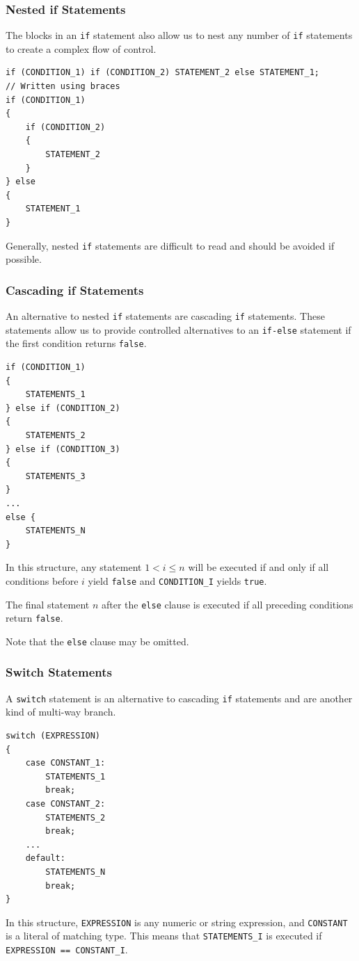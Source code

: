 \documentclass{article}
\begin{document}
\subsubsection{Nested if Statements}
The blocks in an \lstinline{if} statement also allow us to nest any number of
\lstinline{if} statements to create a complex flow of control.
\begin{lstlisting}[numbers=none]
if (CONDITION_1) if (CONDITION_2) STATEMENT_2 else STATEMENT_1;
// Written using braces
if (CONDITION_1) 
{
    if (CONDITION_2) 
    {
        STATEMENT_2
    }
} else 
{
    STATEMENT_1
}
\end{lstlisting}
Generally, nested \lstinline{if} statements are difficult to read and should be avoided if possible.
\subsubsection{Cascading if Statements}
An alternative to nested \lstinline{if} statements are cascading \lstinline{if} statements.
These statements allow us to provide controlled alternatives to an \lstinline{if-else} statement if the
first condition returns \lstinline{false}.
\begin{lstlisting}[numbers=none]
if (CONDITION_1) 
{
    STATEMENTS_1
} else if (CONDITION_2)
{
    STATEMENTS_2
} else if (CONDITION_3)
{
    STATEMENTS_3
} 
...
else {
    STATEMENTS_N
}
\end{lstlisting}
In this structure, any statement \(1 < i \leq n\) will be executed if
and only if all conditions before \(i\) yield \lstinline{false} and
\lstinline{CONDITION_I} yields \lstinline{true}. %

The final statement \(n\) after the \lstinline{else} clause is executed
if all preceding conditions return \lstinline{false}.

Note that the \lstinline{else} clause may be omitted.
\subsubsection{Switch Statements}
A \lstinline{switch} statement is an alternative to cascading \lstinline{if}
statements and are another kind of multi-way branch.
\begin{lstlisting}[numbers=none]
switch (EXPRESSION) 
{
    case CONSTANT_1:
        STATEMENTS_1
        break;
    case CONSTANT_2:
        STATEMENTS_2
        break;
    ...
    default:
        STATEMENTS_N
        break;
}
\end{lstlisting}
In this structure, \lstinline{EXPRESSION} is any numeric or string expression, %
and \lstinline{CONSTANT} is a literal of matching type. %
This means that \lstinline{STATEMENTS_I} is executed if \lstinline{EXPRESSION == CONSTANT_I}. %
\end{document}
